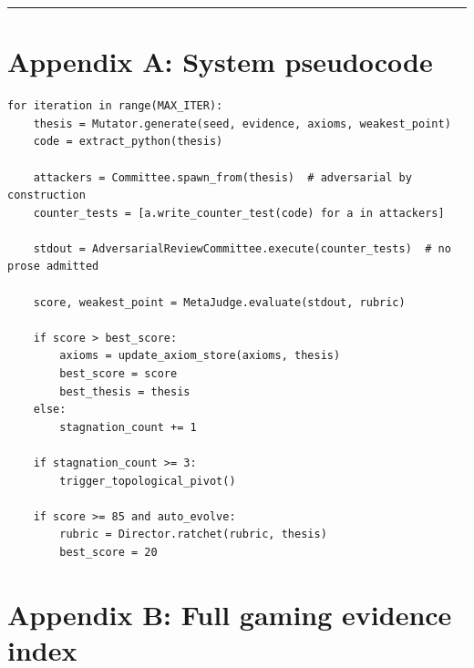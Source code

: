 \documentclass[
  11pt]{article}
\begin{document}
\begin{center}\rule{0.5\linewidth}{0.5pt}\end{center}

\section{Appendix A: System
pseudocode}\label{appendix-a-system-pseudocode}

\begin{verbatim}
for iteration in range(MAX_ITER):
    thesis = Mutator.generate(seed, evidence, axioms, weakest_point)
    code = extract_python(thesis)

    attackers = Committee.spawn_from(thesis)  # adversarial by construction
    counter_tests = [a.write_counter_test(code) for a in attackers]

    stdout = AdversarialReviewCommittee.execute(counter_tests)  # no prose admitted

    score, weakest_point = MetaJudge.evaluate(stdout, rubric)

    if score > best_score:
        axioms = update_axiom_store(axioms, thesis)
        best_score = score
        best_thesis = thesis
    else:
        stagnation_count += 1

    if stagnation_count >= 3:
        trigger_topological_pivot()

    if score >= 85 and auto_evolve:
        rubric = Director.ratchet(rubric, thesis)
        best_score = 20
\end{verbatim}

\section{Appendix B: Full gaming evidence
index}\label{appendix-b-full-gaming-evidence-index}
\end{document}

